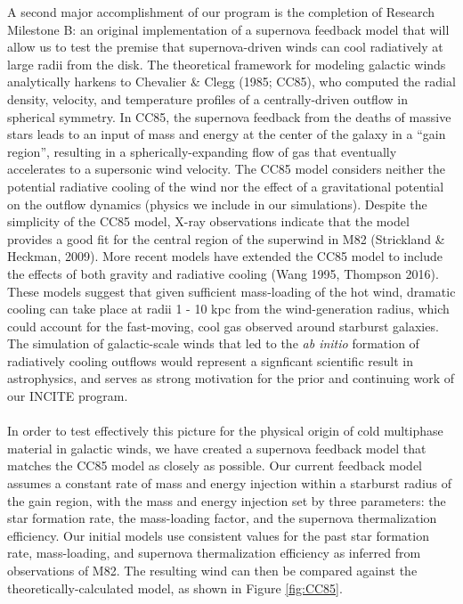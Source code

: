 \documentclass[11pt,letterpaper,english]{article}
\begin{document}
A second major accomplishment of our program is the completion of Research Milestone B: an original
implementation of a supernova feedback model that will allow us to test the premise that supernova-driven winds can cool radiatively at large radii from the disk. The theoretical framework for modeling
galactic winds analytically harkens to Chevalier \& Clegg (1985; CC85), who computed the radial density, velocity,
and temperature profiles of a centrally-driven outflow in spherical symmetry. In CC85, the supernova
feedback from the deaths of massive stars leads to an input of mass and energy at the center of the
galaxy in a ``gain region'', resulting in a spherically-expanding flow of gas that
eventually accelerates to a supersonic wind velocity. The CC85 model considers neither 
the potential 
radiative cooling of the wind nor the effect of a gravitational potential on the outflow dynamics (physics
we include in our simulations).
Despite the simplicity of the CC85 model, X-ray observations indicate that the model provides a good fit for the central region of the superwind in M82 (Strickland \& Heckman, 2009). More recent models have extended the CC85 model to include the effects of both gravity and radiative cooling (Wang 1995, Thompson 2016). These models suggest that given sufficient mass-loading of the hot wind, dramatic cooling can take place at radii 1 - 10 kpc from the wind-generation radius, which could account for the fast-moving, cool gas observed around starburst galaxies. The simulation of galactic-scale winds that led to the \textit{ab initio} formation of radiatively
cooling outflows would represent a signficant scientific result in astrophysics, and serves as strong
motivation for the prior and continuing work of our INCITE program.
~\\~\\
In order to test effectively this picture for the physical origin of cold multiphase material in galactic
winds, we have created a supernova feedback model that matches the CC85 model as closely as possible. 
Our current feedback model assumes a constant rate of mass and energy injection within a starburst radius
of the gain region, with the mass and energy injection set by three parameters: the star formation rate, the mass-loading factor, and the supernova thermalization efficiency. Our initial models use consistent
values for the past star formation rate, mass-loading, and supernova thermalization efficiency as inferred from observations of M82. The resulting wind can then be compared against the theoretically-calculated model, as shown in Figure \ref{fig:CC85}. 
\end{document}
